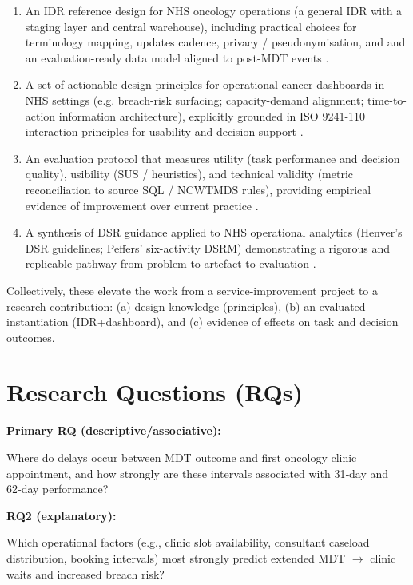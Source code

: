 \documentclass[12pt, a4paper, twoside]{article} %
\begin{document}
\begin{enumerate}
  \item An IDR reference design for NHS oncology operations (a general IDR with a staging layer and central warehouse), including practical choices for terminology mapping, updates cadence, privacy / pseudonymisation, and and an evaluation-ready data model aligned to post-MDT events \citep{gagalova2020}. 
  \item A set of actionable design principles for operational cancer dashboards in NHS settings (e.g. breach-risk surfacing; capacity-demand alignment; time-to-action information architecture), explicitly grounded in ISO 9241-110 interaction principles for usability and decision support \citep{ISO9241-2020}.
  \item An evaluation protocol that measures utility (task performance and decision quality), usibility (SUS / heuristics), and technical validity (metric reconciliation to source SQL / NCWTMDS rules), providing empirical evidence of improvement over current practice \citep{johnson2024}. 
  \item A synthesis of DSR guidance applied to NHS operational analytics (Henver's DSR guidelines; Peffers' six-activity DSRM) demonstrating a rigorous and replicable pathway from problem to artefact to evaluation \citep{hevner2004, Peffers2007}.
\end{enumerate}

Collectively, these elevate the work from a service-improvement project to a research contribution: (a) design knowledge (principles), (b) an evaluated instantiation (IDR+dashboard), and (c) evidence of effects on task and decision outcomes. 

\section{Research Questions (RQs)}

\textbf{Primary RQ (descriptive/associative):}

Where do delays occur between MDT outcome and first oncology clinic appointment, and how strongly are these intervals associated with 31‑day and 62‑day performance? \citep{johnson2024}

\textbf{RQ2 (explanatory):}

Which operational factors (e.g., clinic slot availability, consultant caseload distribution, booking intervals) most strongly predict extended MDT $\rightarrow$ clinic waits and increased breach risk?
\end{document}

